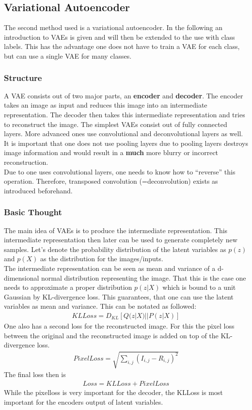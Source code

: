 \documentclass[
     11pt,         %
     a4paper,      %
     oneside,
     ]{article}
\begin{document}
\subsection{Variational Autoencoder}
The second method used is a variational autoencoder. In the following an introduction to VAEs is given and will then be extended to the use with class labels. This has the advantage one does not have to train a VAE for each class, but can use a single VAE for many classes.
\subsubsection{Structure}
A VAE consists out of two major parts, an \textbf{encoder} and \textbf{decoder}. The encoder takes an image as input and reduces this image into an intermediate representation. The decoder then takes this intermediate representation and tries to reconstruct the image. The simplest VAEs consist out of fully connected layers. More advanced ones use convolutional and deconvolutional layers as well. It is important that one does not use pooling layers due to pooling layers destroys image information and would result in a \textbf{much} more blurry or incorrect reconstruction. \\
Due to one uses convolutional layers, one needs to know how to \enquote{reverse} this operation. Therefore, transposed convolution (=deconvolution) exists as introduced beforehand.
\subsubsection{Basic Thought}
The main idea of VAEs is to produce the intermediate representation. This intermediate representation then later can be used to generate completely new samples. Let's denote the probability distribution of the latent variables as $p(z)$ and $p(X)$ as the distribution for the images/inputs. \\
The intermediate representation can be seen as mean and variance of a d-dimensional normal distribution representing the image.
That this is the case one needs to approximate a proper distribution $p(z|X)$ which is bound to a unit Gaussian by KL-divergence loss. This guarantees, that one can use the latent variables as mean and variance. This can be notated as followed:
\begin{align*}
  KLLoss = D_{KL}[Q(z|X)||P(z|X)]
\end{align*}
One also has a second loss for the reconstructed image. For this the pixel loss between the original and the reconstructed image is added on top of the KL-divergence loss.
\begin{align*}
  PixelLoss = \sqrt{\sum_{i,j} (I_{i,j} - R_{i,j})^2}
\end{align*}
The final loss then is
\begin{align*}
  Loss = KLLoss + PixelLoss
\end{align*}
While the pixelloss is very important for the decoder, the KLLoss is most important for the encoders output of latent variables.
\end{document}
